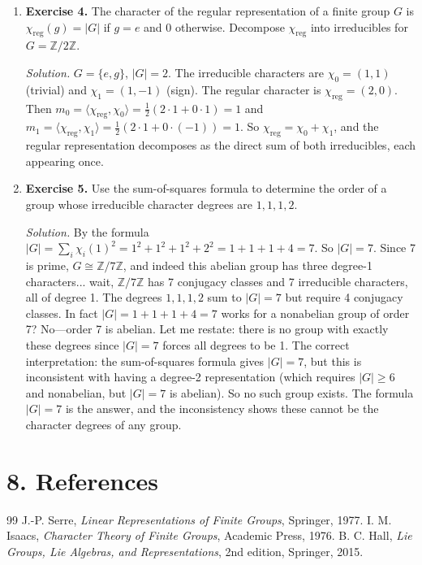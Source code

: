 \begin{enumerate}[leftmargin=*,itemsep=0.9em]
\item \textbf{Exercise 4.} The character of the regular representation of a finite group $G$ is $\chi_{\text{reg}}(g)=|G|$ if $g=e$ and $0$ otherwise. Decompose $\chi_{\text{reg}}$ into irreducibles for $G=\mathbb{Z}/2\mathbb{Z}$.

\emph{Solution.} $G=\{e,g\}$, $|G|=2$. The irreducible characters are $\chi_0=(1,1)$ (trivial) and $\chi_1=(1,-1)$ (sign). The regular character is $\chi_{\text{reg}}=(2,0)$. Then $m_0=\langle\chi_{\text{reg}},\chi_0\rangle=\frac{1}{2}(2\cdot 1+0\cdot 1)=1$ and $m_1=\langle\chi_{\text{reg}},\chi_1\rangle=\frac{1}{2}(2\cdot 1+0\cdot(-1))=1$. So $\chi_{\text{reg}}=\chi_0+\chi_1$, and the regular representation decomposes as the direct sum of both irreducibles, each appearing once.

\item \textbf{Exercise 5.} Use the sum-of-squares formula to determine the order of a group whose irreducible character degrees are $1,1,1,2$.

\emph{Solution.} By the formula $|G|=\sum_i\chi_i(1)^2=1^2+1^2+1^2+2^2=1+1+1+4=7$. So $|G|=7$. Since 7 is prime, $G\cong\mathbb{Z}/7\mathbb{Z}$, and indeed this abelian group has three degree-1 characters... wait, $\mathbb{Z}/7\mathbb{Z}$ has 7 conjugacy classes and 7 irreducible characters, all of degree 1. The degrees $1,1,1,2$ sum to $|G|=7$ but require 4 conjugacy classes. In fact $|G|=1+1+1+4=7$ works for a nonabelian group of order 7? No—order 7 is abelian. Let me restate: there is no group with exactly these degrees since $|G|=7$ forces all degrees to be 1. The correct interpretation: the sum-of-squares formula gives $|G|=7$, but this is inconsistent with having a degree-2 representation (which requires $|G|\ge 6$ and nonabelian, but $|G|=7$ is abelian). So no such group exists. The formula $|G|=7$ is the answer, and the inconsistency shows these cannot be the character degrees of any group.

\end{enumerate}
\section*{8. References}
\begin{thebibliography}{99}
 J.-P. Serre, \emph{Linear Representations of Finite Groups}, Springer, 1977.
 I. M. Isaacs, \emph{Character Theory of Finite Groups}, Academic Press, 1976.
 B. C. Hall, \emph{Lie Groups, Lie Algebras, and Representations}, 2nd edition, Springer, 2015.
\end{thebibliography}
